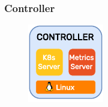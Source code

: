 \subsubsection{Controller}
\label{subsubsec:architecture_components_node_controller}

\begin{figure}
  \centering
  \includegraphics[width=\linewidth]{images/architecture/controller.pdf}
\end{figure}

